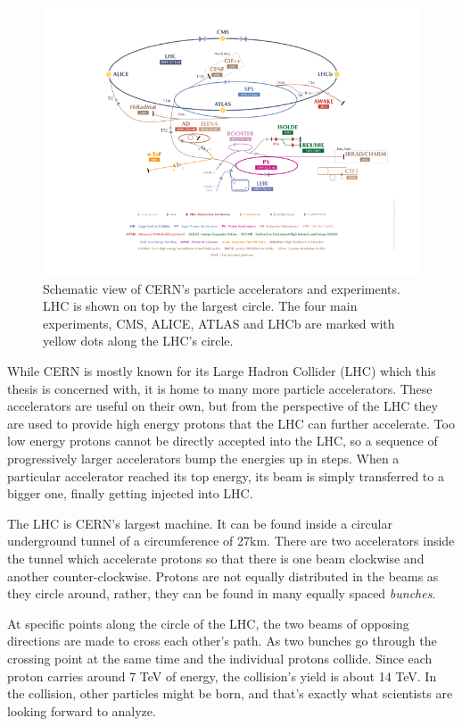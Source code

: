 \documentclass[12pt]{article}
\begin{document}
	\begin{figure}[H]
		\includegraphics[width=\textwidth]{accelerator_complex}
		\caption{Schematic view of CERN's particle accelerators and experiments. LHC is shown on top by the largest circle. The four main experiments, CMS, ALICE, ATLAS and LHCb are marked with yellow dots along the LHC's circle.}
		\label{fig_accel_complex}
	\end{figure}

	While CERN is mostly known for its Large Hadron Collider (LHC) which this thesis is concerned with, it is home to many more particle accelerators. These accelerators are useful on their own, but from the perspective of the LHC they are used to provide high energy protons that the LHC can further accelerate. Too low energy protons cannot be directly accepted into the LHC, so a sequence of progressively larger accelerators bump the energies up in steps. When a particular accelerator reached its top energy, its beam is simply transferred to a bigger one, finally getting injected into LHC.
	
	The LHC is CERN's largest machine. It can be found inside a circular underground tunnel of a circumference of 27km. There are two accelerators inside the tunnel which accelerate protons so that there is one beam clockwise and another counter-clockwise. Protons are not equally distributed in the beams as they circle around, rather, they can be found in many equally spaced \textit{bunches}.
	
	At specific points along the circle of the LHC, the two beams of opposing directions are made to cross each other's path. As two bunches go through the crossing point at the same time and the individual protons collide\cite{lhc_bunch_collisions}. Since each proton carries around 7 TeV of energy, the collision's yield is about 14 TeV. In the collision, other particles might be born, and that's exactly what scientists are looking forward to analyze.	
\end{document}

